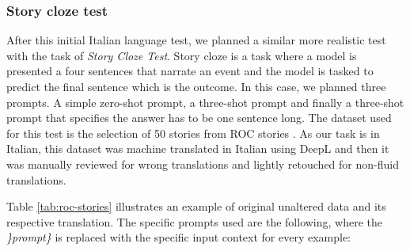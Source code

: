 \subsubsection{Story cloze test}
After this initial Italian language test, we planned a similar more realistic test with the task of \emph{Story Cloze Test}. Story cloze is a task where a model is presented a four sentences that narrate an event and the model is tasked to predict the final sentence which is the outcome. In this case, we planned three prompts. A simple zero-shot prompt, a three-shot prompt and finally a three-shot prompt that specifies the answer has to be one sentence long. The dataset used for this test is the selection of 50 stories from ROC stories \cite{mostafazadeh2016corpus}. As our task is in Italian, this dataset was machine translated in Italian using DeepL \cite{deepl} and then it was manually reviewed for wrong translations and lightly retouched for non-fluid translations. 

Table \ref{tab:roc-stories} illustrates an example of original unaltered data and its respective translation.
The specific prompts used are the following, where the \emph{\}prompt\}} is replaced with the specific input context for every example:
